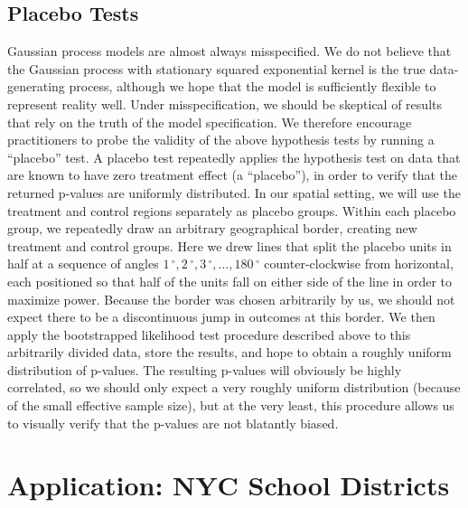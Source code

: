 \documentclass[letter]{article}
\newcommand{\degree}{{\,^\circ}}
\begin{document}
    	\hypertarget{placebo-tests}{%
\subsection{Placebo Tests}\label{placebo-tests}}
    

\label{sec:placebo}
    	Gaussian process models are almost always misspecified.
We do not believe that the Gaussian process with stationary squared exponential kernel is the true data-generating process, although we hope that the model is sufficiently flexible to represent reality well.
Under misspecification, we should be skeptical of results that rely on the truth of the model specification.
We therefore encourage practitioners to probe the validity of the above hypothesis tests by running a ``placebo'' test.
A placebo test repeatedly applies the hypothesis test on data that are known to have zero treatment effect (a ``placebo''),
in order to verify that the returned p-values are uniformly distributed.
In our spatial setting, we will use the treatment and control regions separately as placebo groups.
Within each placebo group, we repeatedly draw an arbitrary geographical border, creating new treatment and control groups.
Here we drew lines that split the placebo units in half at a sequence of angles \(1\degree,2\degree,3\degree,\dotsc,180\degree\) counter-clockwise from horizontal, each positioned so that half of the units fall on either side of the line in order to maximize power.
Because the border was chosen arbitrarily by us, we should not expect there to be a discontinuous jump in outcomes at this border.
We then apply the bootstrapped likelihood test procedure described above to this arbitrarily divided data, store the results, and hope to obtain a roughly uniform distribution of p-values.
The resulting p-values will obviously be highly correlated, so we should only expect a very roughly uniform distribution (because of the small effective sample size), but at the very least, this procedure allows us to visually verify that the p-values are not blatantly biased.
    


    	\hypertarget{example-nyc-school-districts}{%
\section{Application: NYC School Districts}\label{application-nyc-school-districts}}

\label{sec:NYC_example}
\end{document}
